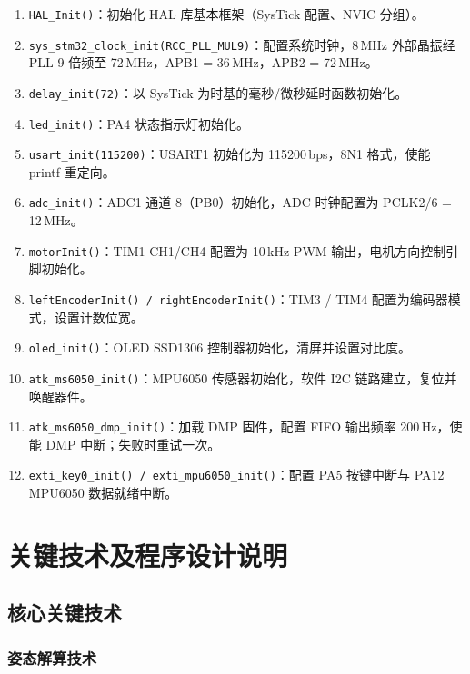 \documentclass[12pt,a4paper,UTF8]{ctexrep}
\begin{document}
\begin{enumerate}
  \item \texttt{HAL\_Init()}：初始化 HAL 库基本框架（SysTick 配置、NVIC 分组）。
  \item \texttt{sys\_stm32\_clock\_init(RCC\_PLL\_MUL9)}：配置系统时钟，8\,MHz 外部晶振经 PLL 9 倍频至 72\,MHz，APB1 = 36\,MHz，APB2 = 72\,MHz。
  \item \texttt{delay\_init(72)}：以 SysTick 为时基的毫秒/微秒延时函数初始化。
  \item \texttt{led\_init()}：PA4 状态指示灯初始化。
  \item \texttt{usart\_init(115200)}：USART1 初始化为 115200\,bps，8N1 格式，使能 printf 重定向。
  \item \texttt{adc\_init()}：ADC1 通道 8（PB0）初始化，ADC 时钟配置为 PCLK2/6 = 12\,MHz。
  \item \texttt{motorInit()}：TIM1 CH1/CH4 配置为 10\,kHz PWM 输出，电机方向控制引脚初始化。
  \item \texttt{leftEncoderInit() / rightEncoderInit()}：TIM3 / TIM4 配置为编码器模式，设置计数位宽。
  \item \texttt{oled\_init()}：OLED SSD1306 控制器初始化，清屏并设置对比度。
  \item \texttt{atk\_ms6050\_init()}：MPU6050 传感器初始化，软件 I2C 链路建立，复位并唤醒器件。
  \item \texttt{atk\_ms6050\_dmp\_init()}：加载 DMP 固件，配置 FIFO 输出频率 200\,Hz，使能 DMP 中断；失败时重试一次。
  \item \texttt{exti\_key0\_init() / exti\_mpu6050\_init()}：配置 PA5 按键中断与 PA12 MPU6050 数据就绪中断。
\end{enumerate}

\chapter{关键技术及程序设计说明}

\section{核心关键技术}

\subsection{姿态解算技术}
\end{document}
